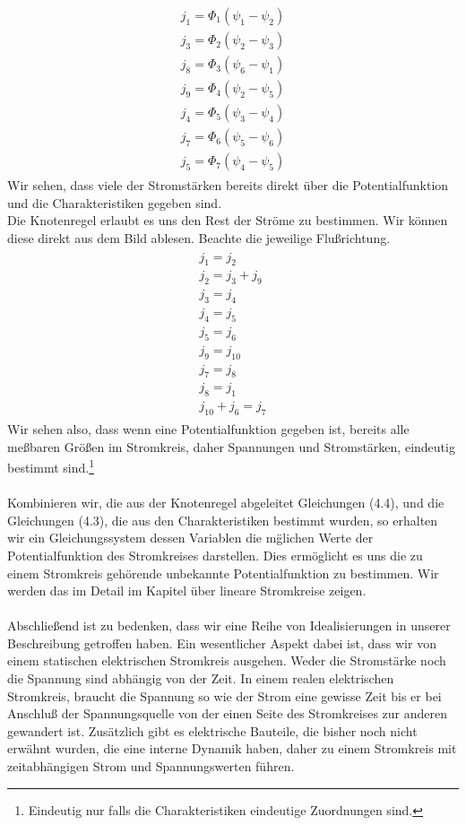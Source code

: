 \documentclass[11pt,a4paper,leqno]{report}
\numberwithin{equation}{chapter}
\begin{document}
\begin{align} 
\begin{split}
j_1 = \Phi_1(\psi_1 - \psi_2)\\
j_3 = \Phi_2(\psi_2 - \psi_3)\\
j_8 = \Phi_3(\psi_6 - \psi_1)\\
j_9 = \Phi_4(\psi_2 - \psi_5)\\
j_4 = \Phi_5(\psi_3 - \psi_4)\\
j_7 = \Phi_6(\psi_5 - \psi_6)\\
j_5 = \Phi_7(\psi_4 - \psi_5)
\end{split}
\end{align}
Wir sehen, dass viele der Stromst\"arken bereits direkt \"uber die Potentialfunktion und die Charakteristiken gegeben sind. \\
Die Knotenregel erlaubt es uns den Rest der Str\"ome zu bestimmen. Wir k\"onnen diese direkt aus dem Bild ablesen. Beachte die jeweilige Flu\ss{}richtung.
\begin{align} 
\begin{split}
j_1 = j_2\\
j_2 = j_3 + j_9\\
j_3 = j_4\\
j_4 = j_5\\
j_5 = j_6\\
j_9 = j_{10}\\
j_7 = j_8\\
j_8 = j_1\\
j_{10} + j_6 = j_7
\end{split}
\end{align}
Wir sehen also, dass wenn eine Potentialfunktion gegeben ist, bereits alle me\ss{}baren Gr\"o\ss{}en im Stromkreis, daher Spannungen und Stromst\"arken, eindeutig bestimmt sind.\footnote{Eindeutig nur falls die Charakteristiken eindeutige Zuordnungen sind.}\\
\\
Kombinieren wir, die aus der Knotenregel abgeleitet Gleichungen (4.4), und die Gleichungen (4.3), die aus den Charakteristiken  bestimmt wurden, so erhalten wir ein Gleichungssystem dessen Variablen die m\"glichen Werte der Potentialfunktion des Stromkreises darstellen. Dies erm\"oglicht es uns die zu einem Stromkreis geh\"orende unbekannte Potentialfunktion zu bestimmen. Wir werden das im Detail im Kapitel \"uber lineare Stromkreise zeigen.
\\
\\
Abschlie\ss{}end ist zu bedenken, dass wir eine Reihe von Idealisierungen in unserer Beschreibung getroffen haben. Ein wesentlicher Aspekt dabei ist, dass wir von einem statischen elektrischen Stromkreis ausgehen. Weder die Stromst\"arke noch die Spannung sind abh\"angig von der Zeit. In einem realen elektrischen Stromkreis, braucht die Spannung so wie der Strom eine gewisse Zeit bis er bei Anschlu\ss{} der Spannungsquelle von der einen Seite des Stromkreises zur anderen gewandert ist. Zus\"atzlich gibt es elektrische Bauteile, die bisher noch nicht erw\"ahnt wurden, die eine interne Dynamik haben, daher zu einem Stromkreis mit zeitabh\"angigen Strom und Spannungswerten f\"uhren.
\end{document}
